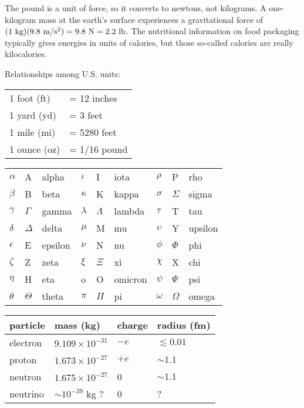 \noindent{}The pound is a unit of force, so it converts to newtons, not kilograms.
A one-kilogram mass at the earth's surface experiences a gravitational force of
$(1\ \kgunit)(9.8\ \munit/\sunit^2)=9.8\ \zu{N}=2.2\ \zu{lb}$. The nutritional
information on food packaging
typically gives energies in units of calories, but those so-called calories are
really kilocalories.

\noindent Relationships among U.S. units:\\
\noindent\begin{tabular}{|l|l|}
\hline
1 foot (ft)	&= 12 inches\\
1 yard (yd) &= 3 feet \\
1 mile (mi) &= 5280 feet\\
1 ounce (oz) &= 1/16 pound\\
\hline
\end{tabular}



\noindent\begin{tabular}{|lll|lll|lll|}
\hline
$\alpha$	& A			& alpha	& $\iota$		& I		& iota &  $\rho$	& P		& rho \\
$\beta$		& B			& beta	& $\kappa$	& K	& kappa & $\sigma$	& $\Sigma$	& sigma \\
$\gamma$	& $\Gamma$	& gamma	& $\lambda$ & $\Lambda$ & lambda & $\tau$ & T & tau\\
$\delta$	& $\Delta$		& delta	& $\mu$	& M	& mu & $\upsilon$ & Y & upsilon \\
$\epsilon$	& E			& epsilon	& $\nu$	& N		& nu & $\phi$ & $\Phi$ & phi\\
$\zeta$		& Z			& zeta	& $\xi$		& $\Xi$		& xi & $\chi$ & X & chi\\
$\eta$		& H			& eta	& o	& O		& omicron & $\psi$ & $\Psi$ & psi\\
$\theta$	& $\Theta$		& theta	& $\pi$		& $\Pi$		& pi & $\omega$ & $\Omega$ & omega\\
\hline
\end{tabular}


\label{subatomicparticlesdata}
\noindent\begin{tabular}{|l|l|l|l|}
\hline
particle	& mass (kg)	& charge	& radius (fm) \\
\hline
electron	& $9.109\times10^{-31}$	& $-e$	& $\lesssim0.01$\\
proton	& $1.673\times10^{-27}$	& $+e$	& $\sim{}1.1$\\
neutron	& $1.675\times10^{-27}$	& 0		& $\sim{}1.1$\\
neutrino	& $\sim10^{-39}$ kg ?	& 0		& 	?\\
\hline
\end{tabular}

